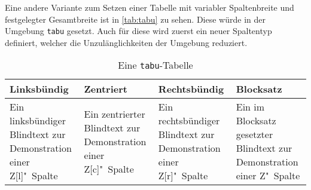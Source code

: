 \documentclass[english,ngerman]{tudscrreprt}
\begin{document}
Eine andere Variante zum Setzen einer Tabelle mit variabler Spaltenbreite und
festgelegter Gesamtbreite ist in \autoref{tab:tabu} zu sehen. Diese würde in
der Umgebung \texttt{tabu} gesetzt. Auch für diese wird zuerst ein neuer
Spaltentyp definiert, welcher die Unzulänglichkeiten der Umgebung reduziert.
\makeatletter
\newcolumntype{Z}{}
\renewcommand*\NC@rewrite@Z[1][]{%
\NC@find>{\hspace{0pt}}X[#1]<{\@finalstrut\@arstrutbox}%
}
\makeatother
\begin{table}
\caption{Eine \texttt{tabu}-Tabelle}\label{tab:tabu}
\begin{tabu} to 
\toprule
\textbf{Linksbündig} & \textbf{Zentriert} &
\textbf{Rechtsbündig} & \textbf{Blocksatz} \tabularnewline
\midrule
Ein linksbündiger Blindtext zur Demonstration einer Z[l]"~Spalte &
Ein zentrierter Blindtext zur Demonstration einer Z[c]"~Spalte &
Ein rechtsbündiger Blindtext zur Demonstration einer Z[r]"~Spalte &
Ein im Blocksatz gesetzter Blindtext zur Demonstration einer Z"~Spalte
\tabularnewline
\bottomrule
\end{tabu}
\end{table}
\printbibliography\label{sec:bibliography}
\end{document}
